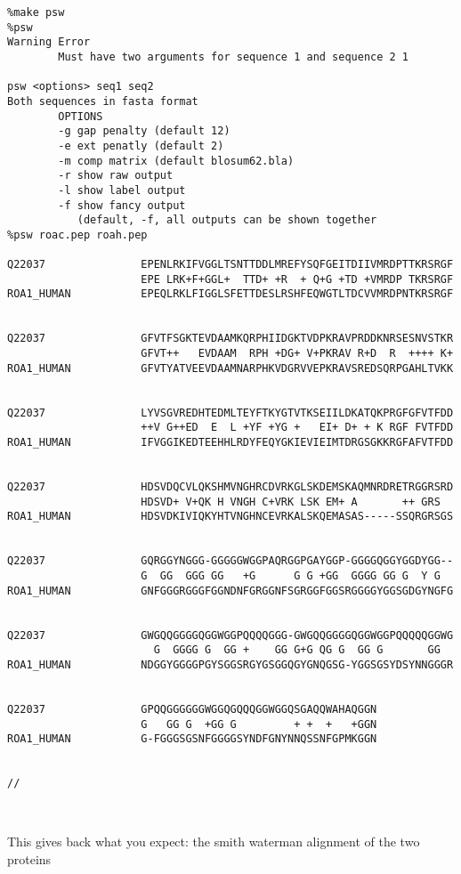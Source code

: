 \begin{verbatim}
%make psw
%psw
Warning Error
        Must have two arguments for sequence 1 and sequence 2 1

psw <options> seq1 seq2
Both sequences in fasta format
        OPTIONS
        -g gap penalty (default 12)
        -e ext penatly (default 2)
        -m comp matrix (default blosum62.bla)
        -r show raw output
        -l show label output
        -f show fancy output
           (default, -f, all outputs can be shown together
%psw roac.pep roah.pep

Q22037               EPENLRKIFVGGLTSNTTDDLMREFYSQFGEITDIIVMRDPTTKRSRGF 
                     EPE LRK+F+GGL+  TTD+ +R  + Q+G +TD +VMRDP TKRSRGF 
ROA1_HUMAN           EPEQLRKLFIGGLSFETTDESLRSHFEQWGTLTDCVVMRDPNTKRSRGF 


Q22037               GFVTFSGKTEVDAAMKQRPHIIDGKTVDPKRAVPRDDKNRSESNVSTKR 
                     GFVT++   EVDAAM  RPH +DG+ V+PKRAV R+D  R  ++++ K+ 
ROA1_HUMAN           GFVTYATVEEVDAAMNARPHKVDGRVVEPKRAVSREDSQRPGAHLTVKK 


Q22037               LYVSGVREDHTEDMLTEYFTKYGTVTKSEIILDKATQKPRGFGFVTFDD 
                     ++V G++ED  E  L +YF +YG +   EI+ D+ + K RGF FVTFDD 
ROA1_HUMAN           IFVGGIKEDTEEHHLRDYFEQYGKIEVIEIMTDRGSGKKRGFAFVTFDD 


Q22037               HDSVDQCVLQKSHMVNGHRCDVRKGLSKDEMSKAQMNRDRETRGGRSRD 
                     HDSVD+ V+QK H VNGH C+VRK LSK EM+ A       ++ GRS   
ROA1_HUMAN           HDSVDKIVIQKYHTVNGHNCEVRKALSKQEMASAS-----SSQRGRSGS 


Q22037               GQRGGYNGGG-GGGGGWGGPAQRGGPGAYGGP-GGGGQGGYGGDYGG-- 
                     G  GG  GGG GG   +G      G G +GG  GGGG GG G  Y G   
ROA1_HUMAN           GNFGGGRGGGFGGNDNFGRGGNFSGRGGFGGSRGGGGYGGSGDGYNGFG 


Q22037               GWGQQGGGGQGGWGGPQQQQGGG-GWGQQGGGGQGGWGGPQQQQQGGWG 
                       G  GGGG G  GG +    GG G+G QG G  GG G       GG   
ROA1_HUMAN           NDGGYGGGGPGYSGGSRGYGSGGQGYGNQGSG-YGGSGSYDSYNNGGGR 


Q22037               GPQQGGGGGGWGGQGQQQGGWGGQSGAQQWAHAQGGN             
                     G   GG G  +GG G         + +  +   +GGN             
ROA1_HUMAN           G-FGGGSGSNFGGGGSYNDFGNYNNQSSNFGPMKGGN             


//



\end{verbatim}

This gives back what you expect: the smith waterman alignment of the two proteins


